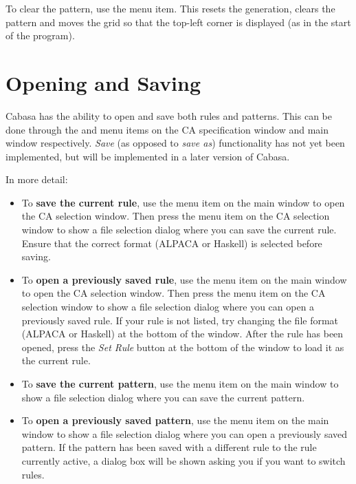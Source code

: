 \documentclass[oneside,a4paper]{memoir}
\begin{document}
To clear the pattern, use the  menu item.
This resets the generation, clears the pattern and moves the grid so that the top-left corner is displayed
  (as in the start of the program).

\section{Opening and Saving}
\label{sec:opsav}

Cabasa has the ability to open and save both rules and patterns.
This can be done through the  and  menu items on the CA specification window and main window respectively.
\textit{Save} (as opposed to \textit{save as}) functionality has not yet been implemented, but will be implemented in a later version of Cabasa.

In more detail:

\begin{itemize}
\item To \textbf{save the current rule}, use the  menu item on the main window to open the CA selection window.
  Then press the  menu item on the CA selection window to show a file selection dialog where you can save the current rule.
  Ensure that the correct format (ALPACA or Haskell) is selected before saving.
\item To \textbf{open a previously saved rule}, use the  menu item on the main window to open the CA selection window.
  Then press the  menu item on the CA selection window to show a file selection dialog where you can open a previously saved rule.
  If your rule is not listed, try changing the file format (ALPACA or Haskell) at the bottom of the window.
  After the rule has been opened, press the \textit{Set Rule} button at the bottom of the window to load it as the current rule.
\item To \textbf{save the current pattern}, use the  menu item on the main window to show a file selection dialog where you can save the current pattern.
\item To \textbf{open a previously saved pattern}, use the  menu item on the main window to show a file selection dialog where you can open a previously saved pattern.
  If the pattern has been saved with a different rule to the rule currently active,
    a dialog box will be shown asking you if you want to switch rules.
\end{itemize}
\end{document}
